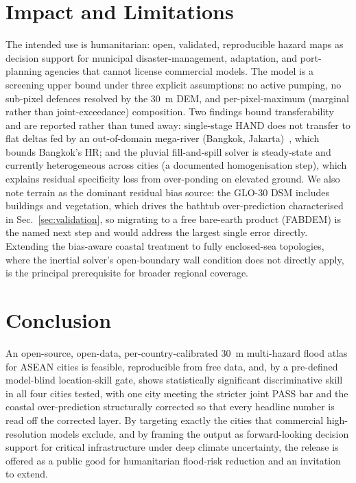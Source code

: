 \documentclass[conference]{IEEEtran}
\begin{document}
\section{Impact and Limitations}
\label{sec:impact}
The intended use is humanitarian: open, validated, reproducible hazard maps as decision support for municipal disaster-management, adaptation, and port-planning agencies that cannot license commercial models. The model is a screening upper bound under three explicit assumptions: no active pumping, no sub-pixel defences resolved by the 30~m DEM, and per-pixel-maximum (marginal rather than joint-exceedance) composition. Two findings bound transferability and are reported rather than tuned away: single-stage HAND does not transfer to flat deltas fed by an out-of-domain mega-river (Bangkok, Jakarta)~\cite{komori2012}, which bounds Bangkok's HR; and the pluvial fill-and-spill solver is steady-state and currently heterogeneous across cities (a documented homogenisation step), which explains residual specificity loss from over-ponding on elevated ground. We also note terrain as the dominant residual bias source: the GLO-30 DSM includes buildings and vegetation, which drives the bathtub over-prediction characterised in Sec.~\ref{sec:validation}, so migrating to a free bare-earth product (FABDEM) is the named next step and would address the largest single error directly. Extending the bias-aware coastal treatment to fully enclosed-sea topologies, where the inertial solver's open-boundary wall condition does not directly apply, is the principal prerequisite for broader regional coverage.

\section{Conclusion}
An open-source, open-data, per-country-calibrated 30~m multi-hazard flood atlas for ASEAN cities is feasible, reproducible from free data, and, by a pre-defined model-blind location-skill gate, shows statistically significant discriminative skill in all four cities tested, with one city meeting the stricter joint PASS bar and the coastal over-prediction structurally corrected so that every headline number is read off the corrected layer. By targeting exactly the cities that commercial high-resolution models exclude, and by framing the output as forward-looking decision support for critical infrastructure under deep climate uncertainty, the release is offered as a public good for humanitarian flood-risk reduction and an invitation to extend.
\end{document}

